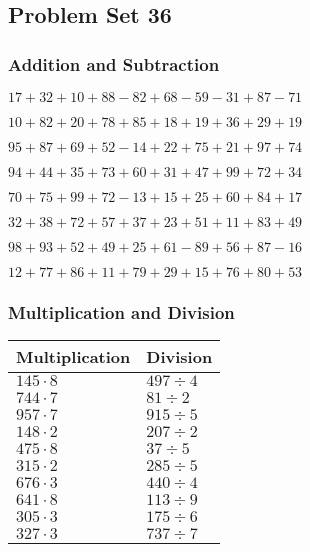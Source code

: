\hypertarget{problem-set-36}{%
\subsection{Problem Set 36}\label{problem-set-36}}

\hypertarget{addition-and-subtraction}{%
\subsubsection{Addition and
Subtraction}\label{addition-and-subtraction}}

\(17+32+10+88-82+68-59-31+87-71\)

\(10+82+20+78+85+18+19+36+29+19\)

\(95+87+69+52-14+22+75+21+97+74\)

\(94+44+35+73+60+31+47+99+72+34\)

\(70+75+99+72-13+15+25+60+84+17\)

\(32+38+72+57+37+23+51+11+83+49\)

\(98+93+52+49+25+61-89+56+87-16\)

\(12+77+86+11+79+29+15+76+80+53\)

\hypertarget{multiplication-and-division}{%
\subsubsection{Multiplication and
Division}\label{multiplication-and-division}}

\begin{longtable}[]{@{}ll@{}}
\toprule
Multiplication & Division\tabularnewline
\midrule
\endhead
\(145\cdot8\) & \(497÷4\)\tabularnewline
\(744\cdot7\) & \(81÷2\)\tabularnewline
\(957\cdot7\) & \(915÷5\)\tabularnewline
\(148\cdot2\) & \(207÷2\)\tabularnewline
\(475\cdot8\) & \(37÷5\)\tabularnewline
\(315\cdot2\) & \(285÷5\)\tabularnewline
\(676\cdot3\) & \(440÷4\)\tabularnewline
\(641\cdot8\) & \(113÷9\)\tabularnewline
\(305\cdot3\) & \(175÷6\)\tabularnewline
\(327\cdot3\) & \(737÷7\)\tabularnewline
\bottomrule
\end{longtable}
